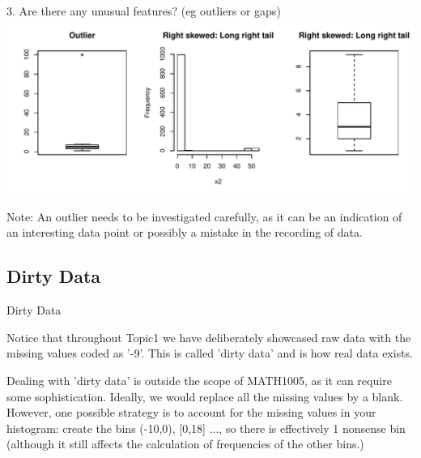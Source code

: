 \documentclass[t,xcolor=pdftex,dvipsnames,table]{beamer}\usepackage[]{graphicx}\usepackage[]{color}
\makeatletter
\def\maxwidth{ %
  \ifdim\Gin@nat@width>\linewidth
    \linewidth
  \else
    \Gin@nat@width
  \fi
}
\newenvironment{knitrout}{}{} %
\makeatother
\begin{document}
\begin{frame}[fragile]{}

3. Are there any unusual features?  (eg outliers or gaps)
\begin{knitrout}
\color{fgcolor}
\includegraphics[width=\maxwidth]{figure/unnamed-chunk-21-1} 

\end{knitrout}


Note: An outlier needs to be investigated carefully, as it can be an indication of an interesting data point or possibly a mistake in the recording of data.
\end{frame}


\subsection[]{Dirty Data}
\begin{frame}[fragile]{Dirty Data}

Notice that throughout Topic1 we have deliberately showcased raw data with the missing values coded as '-9'. This is called 'dirty data' and is how real data exists. 

\vspace{.5cm}
Dealing with 'dirty data' is outside the scope of MATH1005, as it can require some sophistication. Ideally, we would replace all the missing values by a blank. However, one possible strategy is to account for the missing values in your histogram: create the bins (-10,0), [0,18] ..., so there is effectively 1 nonsense bin (although it still affects the calculation of frequencies of the other bins.)
\end{frame}










\end{document}
